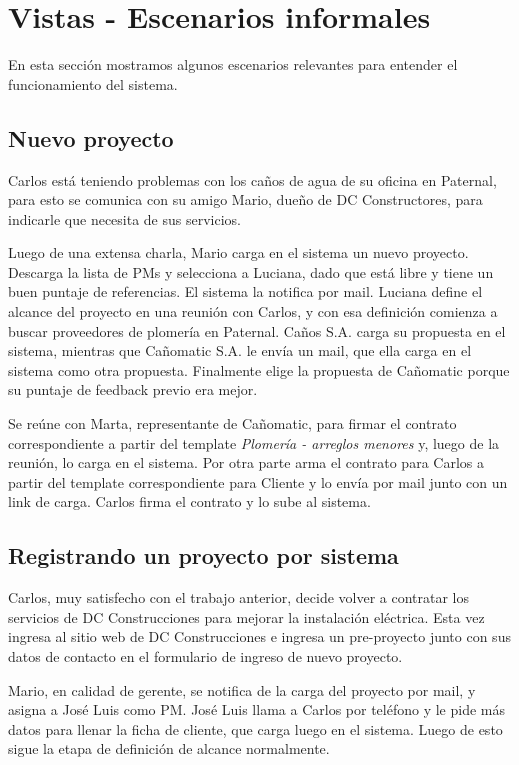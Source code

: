 \section{Vistas - Escenarios informales}

En esta sección mostramos algunos escenarios relevantes para entender el funcionamiento del sistema.

\subsection{Nuevo proyecto} 
Carlos está teniendo problemas con los caños de agua de su oficina en Paternal, para esto se comunica con su amigo Mario, dueño de DC Constructores, para indicarle que necesita de sus servicios.

Luego de una extensa charla, Mario carga en el sistema un nuevo proyecto. Descarga la lista de PMs y selecciona a Luciana, dado que está libre y tiene un buen puntaje de referencias. El sistema la notifica por mail.
Luciana define el alcance del proyecto en una reunión con Carlos, y con esa definición comienza a buscar proveedores de plomería en Paternal. 
Caños S.A. carga su propuesta en el sistema, mientras que Cañomatic S.A. le envía un mail, que ella carga en el sistema como otra propuesta. Finalmente elige la propuesta de Cañomatic porque su puntaje de feedback previo era mejor.

Se reúne con Marta, representante de Cañomatic, para firmar el contrato correspondiente a partir del template \textit{Plomería - arreglos menores} y, luego de la reunión, lo carga en el sistema. Por otra parte arma el contrato para Carlos a partir del template correspondiente para Cliente y lo envía por mail junto con un link de carga. Carlos firma el contrato y lo sube al sistema.


\subsection{Registrando un proyecto por sistema} 
Carlos, muy satisfecho con el trabajo anterior, decide volver a contratar los servicios de DC Construcciones para mejorar la instalación eléctrica. Esta vez ingresa al sitio web de DC Construcciones e ingresa un pre-proyecto junto con sus datos de contacto en el formulario de ingreso de nuevo proyecto.

Mario, en calidad de gerente, se notifica de la carga del proyecto por mail, y asigna a José Luis como PM. José Luis llama a Carlos por teléfono y le pide más datos para llenar la ficha de cliente, que carga luego en el sistema. Luego de esto sigue la etapa de definición de alcance normalmente.

